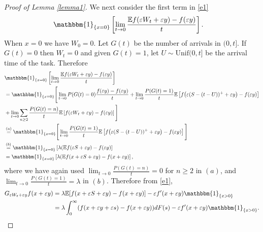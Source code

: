 \documentclass[11pt,letterpaper,reqno]{article}
\theoremstyle{thmstyleone}%
\theoremstyle{thmstyletwo}%
\theoremstyle{thmstylethree}%
\numberwithin{equation}{section}
\begin{document}
\begin{proof}[Proof of Lemma \ref{lemma1}]
We next consider the first term in \eqref{e1}
\begin{align*}
    &\mathbbm{1}_{\{x=0\}}\left[ \lim_{t \to 0} \frac{\mathbb Ef(\varepsilon W_t+\varepsilon y)-f(\varepsilon y)}{t}\right].
\end{align*}
When $x=0$ we have $W_0=0$. Let $G(t)$ be the number of arrivals in $(0,t]$. If $G(t)=0$ then $W_t=0$ and given $G(t)=1$, let $U \sim \text{Unif}(0,t]$ be the arrival time of the task. Therefore
\begin{align*}
&\mathbbm{1}_{\{x=0\}}\left[ \lim_{t \to 0} \frac{\mathbb{E}f(\varepsilon W_t+\varepsilon y)-f(\varepsilon y)}{t}\right] \\
&=\mathbbm{1}_{\{x=0\}}\Bigg[\lim_{t \to 0}
P(G(t)=0)\frac{f(\varepsilon y)-f(\varepsilon y)}{t}
+\lim_{t \to 0}\frac{P(G(t)=1)}{t}\mathbb{E}\left[f\big(\varepsilon(S-(t-U))^+ + \varepsilon y\big)-f(\varepsilon y)\right] \\
&+\lim_{t \to 0}\sum_{n\ge 2}\frac{P(G(t)=n)}{t}\mathbb{E}\left[f(\varepsilon W_t+\varepsilon y)-f(\varepsilon y)\right]\Bigg]\\
&\stackrel{(a)}{=}\mathbbm{1}_{\{x=0\}}\Bigg[\lim_{t \to 0}\frac{P(G(t)=1)}{t}\mathbb{E}\left[f\big(\varepsilon(S-(t-U))^+ + \varepsilon y\big)-f(\varepsilon y)\right]\Bigg]\\
&\stackrel{(b)}{=}\mathbbm{1}_{\{x=0\}}\left[\lambda(\mathbb E f(\varepsilon S+\varepsilon y)-f(\varepsilon y) \right]\\
&=\mathbbm{1}_{\{x=0\}}\left[\lambda(\mathbb E f(x+\varepsilon S+\varepsilon y)-f(x+\varepsilon y) \right],
\end{align*}
where  we have again used $\lim_{t \to 0}\frac{P(G(t)=n)}{t}=0$  for $n \geq 2$ in $(a)$, and $\lim_{t \to 0}\frac{P(G(t)=1)}{t}=\lambda$ in $(b)$. 
Therefore from \eqref{e1},
\begin{align}\label{stg25}
     G_{\varepsilon W_t+\varepsilon y}f(x+\varepsilon y)&=\lambda \mathbb E[f(x+\varepsilon S+\varepsilon y)-f(x+\varepsilon y)]-\varepsilon f'(x+\varepsilon y)\mathbbm{1}_{\{x>0\}} \nonumber\\
     &=\lambda \int_0^\infty (f(x+\varepsilon y +\varepsilon s)-f(x+\varepsilon y))dF(s)-\varepsilon f'(x+\varepsilon y)\mathbbm{1}_{\{x>0\}}.
\end{align}
\end{proof}
\end{document}
